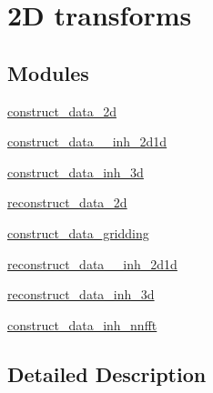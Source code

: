 \hypertarget{group__applications__mri2d}{\section{2\-D transforms}
\label{group__applications__mri2d}
}
\subsection*{Modules}
\begin{DoxyCompactItemize}
\item 
\hyperlink{group__applications__mri2d__construct__data__2d}{construct\-\_\-data\-\_\-2d}
\item 
\hyperlink{group__applications__mri2d__construct__data__inh__2d1d}{construct\-\_\-data\-\_\-\-\_\-inh\-\_\-2d1d}
\item 
\hyperlink{group__applications__mri2d__construct__data__inh__3d}{construct\-\_\-data\-\_\-inh\-\_\-3d}
\item 
\hyperlink{group__applications__mri2d__reconstruct__data__2d}{reconstruct\-\_\-data\-\_\-2d}
\item 
\hyperlink{group__applications__mri2d__construct__data__gridding}{construct\-\_\-data\-\_\-gridding}
\item 
\hyperlink{group__applications__mri2d__reconstruct__data__inh__2d1d}{reconstruct\-\_\-data\-\_\-\-\_\-inh\-\_\-2d1d}
\item 
\hyperlink{group__applications__mri2d__reconstruct__data__inh__3d}{reconstruct\-\_\-data\-\_\-inh\-\_\-3d}
\item 
\hyperlink{group__applications__mri2d__construct__data__inh__nnfft}{construct\-\_\-data\-\_\-inh\-\_\-nnfft}
\end{DoxyCompactItemize}


\subsection{Detailed Description}
